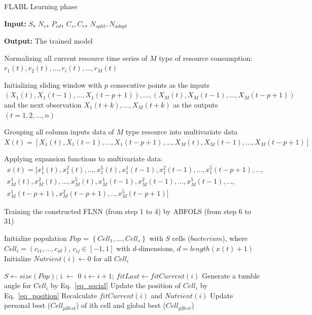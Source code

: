 \documentclass[runningheads]{llncs}
\begin{document}
\begin{algorithm}
	\caption{FLABL Learning phase }\label{algo_BFO}
	\hspace*{\algorithmicindent} \textbf{Input:} 
	\textbf{ $S$, $N_s$, $P_{ed}$, $C_s, C_e$, $N_{split}, N_{adapt}$ }
	
	\hspace*{\algorithmicindent} \textbf{Output:} The trained model
	
	\begin{algorithmic}[1]
		\State Normalizing all current resource time series of $M$ type of resource consumption: 
			\Statex $r_1(t),r_2(t),...,r_i(t),...,r_M(t)$
		
		\State Initializing sliding window with $p$ consecutive points as the inputs 
			\Statex $(X_1(t), X_1(t-1), ..., X_1(t-p+1)),..., (X_M(t), X_M(t-1), ..., X_M(t-p+1))$  
			\Statex and the next observation 
			\Statex $X_1(t+k), ..., X_M(t+k)$ as the outputs $(t = 1,2,...,n)$
		
		\State Grouping all column inputs data of $M$ type resource into multivariate data
			\Statex $X(t) = [ X_1(t), X_1(t-1), ..., X_1(t-p+1), ..., X_M(t), X_M(t-1), ..., X_M(t-p+1) ]$
		
		\State Applying expansion functions to multivariate data: 
			\begin{equation}
				\begin{split}
			x(t) = [ x_1^1(t), x_1^2(t), ..., x_1^5(t), x_1^1(t-1), x_1^2(t-1), ..., x_1^5(t-p+1), ..., \\
				  x_M^1(t), x_M^2(t), ..., x_M^5(t), x_M^1(t-1), x_M^2(t-1), ..., x_M^5(t-1), ..., \\
				  x_M^1(t-p+1), x_M^2(t-p+1),.., x_M^5(t-p+1) ]
				\end{split}
			\end{equation}
		
		\State Training the constructed FLNN (from step 1 to 4) by ABFOLS (from step 6 to 31)
		
		\State Initialize population $Pop$ = $ \left\{ Cell_1,. . . , Cell_{s} \right\}$ with $S$ cells ($bacterium$),
			\Statex where $Cell_i = (c_{i1}, …, c_{id})$, $c_{ij} \in [-1, 1]$ with $d$-dimensions, $d = length(x(t) + 1)$
			\Statex Initialize $Nutrient(i) \gets 0$ for all $Cell_i$
			
			\State $S \gets size(Pop)$; i $\gets$ 0  						%
				\State $ i \gets i+1$; $ fitLast \gets fitCurrent(i) $ 
				\State Generate a tumble angle for $Cell_i$ by Eq.~\ref{eq_social}
				\State Update the position of $Cell_i$ by Eq.~\ref{eq_position}
				\State Recalculate $fitCurrent(i)$ and $Nutrient(i)$ 
				\State Update personal best ($Cell_{pBest}$) of ith cell and global best ($Cell_{gBest}$)
				

\end{algorithmic}
\end{algorithm}
\end{document}
